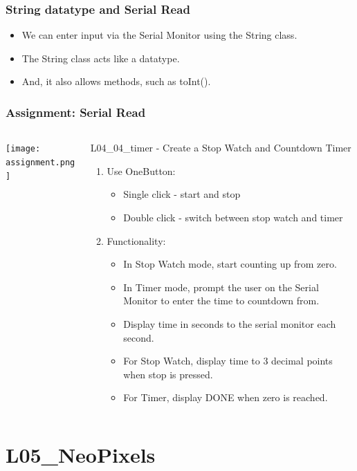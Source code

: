\documentclass{beamer}
\begin{document}
\begin{frame}\frametitle{String datatype and Serial Read}
\begin{itemize}
\item We can enter input via the Serial Monitor using the String class.
\item The String class acts like a datatype.
\item And, it also allows methods, such as toInt().
\end{itemize}

\vspace{0.25cm}
\lststr
\end{frame}


\begin{frame}\frametitle{Assignment: Serial Read}
\begin{columns}
\begin{column}{3cm}
\texttt{[image: assignment.png]}
\end{column}
\begin{column}{8.3cm}
L04\_04\_timer - Create a Stop Watch and Countdown Timer
\begin{enumerate}
\item Use OneButton:
	\begin{itemize}
	\item Single click - start and stop
	\item Double click - switch between stop watch and timer 
	\end{itemize}
\item Functionality:
	\begin{itemize}
	\item In Stop Watch mode, start counting up from zero. 
	\item In Timer mode, prompt the user on the Serial Monitor to enter the time to countdown from.
	\item Display time in seconds to the serial monitor each second.
	\item For Stop Watch, display time to 3 decimal points when stop is pressed.
	\item For Timer, display DONE when zero is reached.  
	\end{itemize}
\end{enumerate}
\end{column}
\end{columns}
\end{frame}

\section{L05\_NeoPixels}
\end{document}
